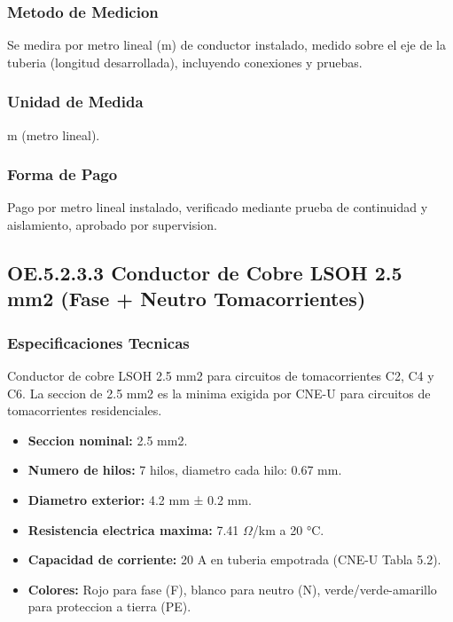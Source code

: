 \subsubsection{Metodo de Medicion}

Se medira por metro lineal (m) de conductor instalado, medido sobre el eje de la tuberia (longitud desarrollada), incluyendo conexiones y pruebas.

\subsubsection{Unidad de Medida}

m (metro lineal).

\subsubsection{Forma de Pago}

Pago por metro lineal instalado, verificado mediante prueba de continuidad y aislamiento, aprobado por supervision.

\subsection{OE.5.2.3.3 Conductor de Cobre LSOH 2.5 mm2 (Fase + Neutro Tomacorrientes)}

\subsubsection{Especificaciones Tecnicas}

Conductor de cobre LSOH 2.5 mm2 para circuitos de tomacorrientes C2, C4 y C6. La seccion de 2.5 mm2 es la minima exigida por CNE-U para circuitos de tomacorrientes residenciales.

\begin{itemize}[nosep]
  \item \textbf{Seccion nominal:} 2.5 mm2.
  \item \textbf{Numero de hilos:} 7 hilos, diametro cada hilo: 0.67 mm.
  \item \textbf{Diametro exterior:} 4.2 mm ± 0.2 mm.
  \item \textbf{Resistencia electrica maxima:} 7.41 $\Omega$/km a 20 °C.
  \item \textbf{Capacidad de corriente:} 20 A en tuberia empotrada (CNE-U Tabla 5.2).
  \item \textbf{Colores:} Rojo para fase (F), blanco para neutro (N), verde/verde-amarillo para proteccion a tierra (PE).
\end{itemize}


